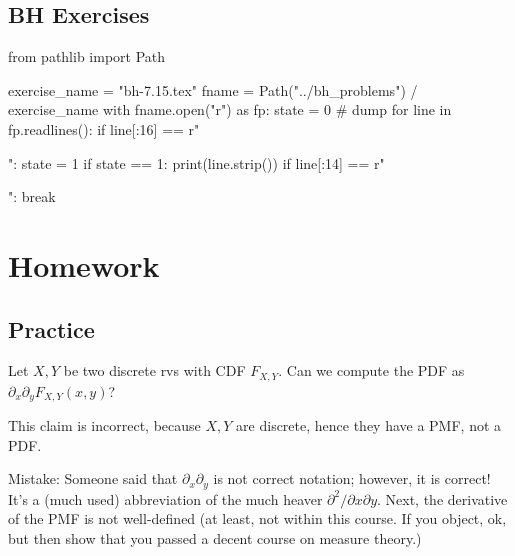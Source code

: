 \subsection{BH Exercises}


\begin{pycode}
from pathlib import Path

exercise_name = "bh-7.15.tex"
fname = Path("../bh_problems") / exercise_name
with fname.open("r") as fp:
    state = 0  # dump
    for line in fp.readlines():
        if line[:16] == r"\begin{exercise}":
            state = 1
        if state == 1:
            print(line.strip())
        if line[:14] == r"\end{exercise}":
            break
\end{pycode}


\section{Homework}
\label{sec:homework}

\subsection{Practice}
\label{sec:practice}



\begin{exercise}
Let $X, Y$ be two discrete rvs with CDF $F_{X,Y}$.  Can we compute the PDF as $\partial_{x}\partial_{y} F_{X,Y}(x,y)$?
\begin{solution}
This claim is incorrect, because $X, Y$ are discrete, hence they have a PMF, not a PDF.

Mistake: Someone said that $\partial_{x}\partial_{y}$ is not correct notation; however, it is correct! It's a (much used) abbreviation of the much heaver $\partial^{2}/\partial x \partial y$. Next, the derivative of the PMF is not well-defined (at least, not within this course. If you object, ok, but then show that you passed a decent course on measure theory.)
\end{solution}
\end{exercise}



